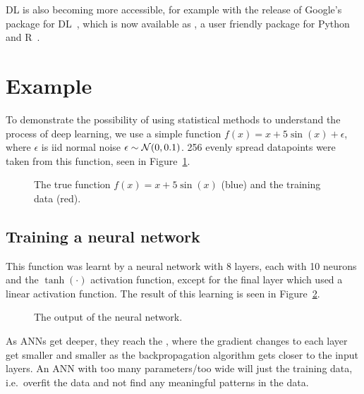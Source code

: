 \ac{DL} is also becoming more accessible, for example with the release of Google's  package for \ac{DL}~\autocite{abadi2016}, which is now available as , a user friendly package for Python~\autocite{chollet2015} and R~\autocite{allaire2018}.

\section{Example}

To demonstrate the possibility of using statistical methods to understand the process of deep learning, we use a simple function \(f(x) = x + 5 \sin(x) + \epsilon\), where \(\epsilon\) is iid normal noise \(\epsilon \sim \mathcal{N}(0, 0.1)\).
256 evenly spread datapoints were taken from this function, seen in Figure~\ref{fig:sin-x-dataset}. 

\begin{figure}[htbp]
	\centering
	
	\caption{The true function \(f(x) = x + 5 \sin(x)\) (blue) and the training data (red).}
	\label{fig:sin-x-dataset}
\end{figure}


\subsection{Training a neural network}

This function was learnt by a neural network with 8 layers, each with 10 neurons and the \(\tanh(\cdot)\) activation function, except for the final layer which used a linear activation function.
The result of this learning is seen in Figure~\ref{fig:ann-preds}.

\begin{figure}[htbp]
	\centering
	
	\caption{The output of the neural network.}
	\label{fig:ann-preds}
\end{figure}

As \acp{ANN} get deeper, they reach the , where the gradient changes to each layer get smaller and smaller as the backpropagation algorithm gets closer to the input layers.
An \ac{ANN} with too many parameters/too wide will just  the training data, i.e.\ overfit the data and not find any meaningful patterns in the data.


